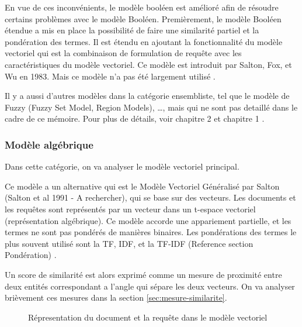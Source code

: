 En vue de ces inconvénients, le modèle booléen est amélioré afin de résoudre certains problèmes avec le modèle Booléen. Premièrement, le modèle Booléen étendue a mis en place la possibilité de faire une similarité partiel et la pondération des termes. Il est étendu en ajoutant la fonctionnalité du modèle vectoriel qui est la combinaison de formulation de requête avec les caractéristiques du modèle vectoriel. Ce modèle est introduit par Salton, Fox, et Wu en 1983. Mais ce modèle n'a pas été largement utilisé \citep{modern-ir}.

Il y a aussi d'autres modèles dans la catégorie ensembliste, tel que le modèle de Fuzzy (Fuzzy Set Model, Region Models), \dots, mais qui ne sont pas detaillé dans le cadre de ce mémoire. Pour plus de détails, voir chapitre 2 \citep{modern-ir} et chapitre 1 \citep{model-ir}.

\subsubsection{Modèle algébrique}
Dans cette catégorie, on va analyser le modèle vectoriel principal.

Ce modèle a un alternative qui est le Modèle Vectoriel Généralisé par Salton (Salton et al 1991 - A rechercher), qui se base sur des vecteurs. Les documents et les requêtes sont représentés par un vecteur dans un t-espace vectoriel (représentation algébrique). Ce modèle accorde une appariement partielle, et les termes ne sont pas pondérés de manières binaires. Les pondérations des termes le plus souvent utilisé sont la TF, IDF, et la TF-IDF (Reference section Pondération) \citep*{sarch-engine-vsm}.

Un score de similarité est alors exprimé comme un mesure de proximité entre deux entités correspondant a l'angle qui sépare les deux vecteurs. On va analyser brièvement ces mesures dans la section \ref{sec:mesure-similarite}.

\begin{figure}[htbp]
    \begin{center}
    \end{center}
    \caption{Répresentation du document et la requête dans le modèle vectoriel \citep{model-ir}}
    \label{fig:vector-model}
\end{figure}

